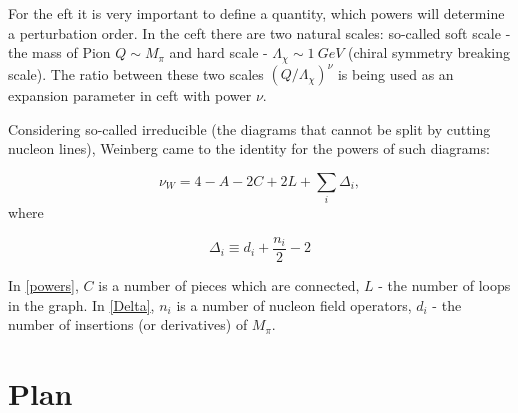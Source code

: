 For the \gls*{eft} it is very important to 
define a quantity, which powers will determine a perturbation order.
In the \gls*{ceft} there are two natural scales: so-called soft scale -
the mass of Pion $Q \sim M_\pi$ and hard scale -
$\Lambda_\chi \sim 1~GeV$ (chiral symmetry breaking scale).
The ratio between these two scales $(Q/\Lambda_\chi)^\nu$
is being used as an expansion parameter in  \gls*{ceft} with power
$\nu$.

Considering so-called irreducible (the diagrams that cannot be split
by cutting nucleon lines), Weinberg \cite{WEINBERG1990,WEINBERG1991}
came to the identity for the powers of such diagrams\cite{Machleidt2011}:

\begin{equation}
    \nu_W = 4 - A - 2C + 2L + \sum_i \Delta_i,
    \label{powers}
\end{equation}
where

\begin{equation}
    \Delta_i \equiv d_i + \frac{n_i}{2} - 2
    \label{Delta}
\end{equation}

In \ref*{powers}, $C$ is a number of pieces which are connected, $L$ - the number of loops in the graph.
In \ref*{Delta}, $n_i$ is a number of nucleon field operators, $d_i$ - the number of insertions
(or derivatives) of  $M_\pi$.


\chapter{Plan}

